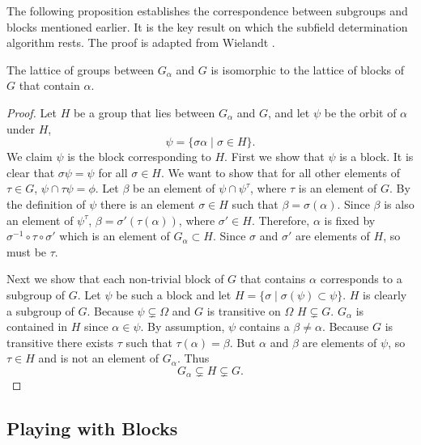 The following proposition establishes the correspondence between
subgroups and blocks mentioned earlier.  It is the key result on which
the subfield determination algorithm rests.  The proof is adapted from
Wielandt \cite{Wielandt64}.

\begin{proposition}\label{Group:Zeroes:Prop}
The lattice of groups between $G_{\alpha}$ and $G$ is isomorphic to
the lattice of blocks of $G$ that contain $\alpha$.
\end{proposition}

\begin{proof}
Let $H$ be a group that lies between $G_\alpha$ and $G$, and let
$\psi$ be the orbit of $\alpha$ under $H$, 
\[
\psi = \{ \sigma \alpha \mid \sigma \in H \}.
\]
We claim $\psi$ is the block corresponding to $H$.  First we show that
$\psi$ is a block.  It is clear that $\sigma \psi = \psi$ for all
$\sigma \in H$.  We want to show that for all other elements of $\tau
\in G$, $\psi \cap \tau \psi = \phi$.  Let $\beta$ be an element of
$\psi \cap \psi^{\tau}$, where $\tau$ is an element of $G$.  By the
definition of $\psi$ there is an element $\sigma \in H$ such that
$\beta = \sigma(\alpha)$.  Since $\beta$ is also an element of
$\psi^{\tau}$, $\beta = \sigma'(\tau(\alpha))$, where $\sigma' \in H$.
Therefore, $\alpha$ is fixed by $\sigma^{-1} \circ \tau \circ \sigma'$
which is an element of $G_{\alpha} \subset H$.  Since $\sigma$ and
$\sigma'$ are elements of $H$, so must be $\tau$.

Next we show that each non-trivial block of $G$ that contains $\alpha$
corresponds to a subgroup of $G$.  Let $\psi$ be such a block and let
$H = \{\sigma \mid \sigma(\psi) \subset \psi\}$.  $H$ is clearly a
subgroup of $G$.  Because $\psi \varsubsetneq \Omega$ and $G$ is
transitive on $\Omega$ $H \varsubsetneq G$.  $G_{\alpha}$ is contained
in $H$ since $\alpha \in \psi$.  By assumption, $\psi$ contains a $\beta \not=
\alpha$.  Because $G$ is transitive there exists $\tau$ such that
$\tau(\alpha) = \beta$.  But $\alpha$ and $\beta$ are elements of
$\psi$, so $\tau \in H$ and is not an element of $G_{\alpha}$.  Thus
\[
G_{\alpha} \varsubsetneq H \varsubsetneq G.
\]
\end{proof}


\subsection{Playing with Blocks}

